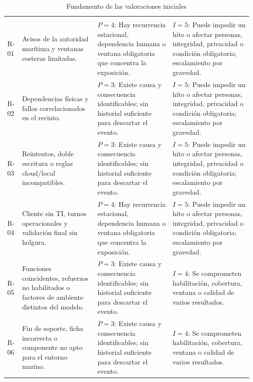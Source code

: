 \begin{longtable}{L{.10\textwidth}L{.27\textwidth}L{.27\textwidth}L{.27\textwidth}}
\caption{Fundamento de las valoraciones iniciales}\label{tab:sd8-fundamentos}\\\hline
{} &  &  & \\\hline\endfirsthead
\hline{} &  &  & \\\hline\endhead
R-01 & Avisos de la autoridad marítima y ventanas costeras limitadas. & $P=4$: Hay recurrencia estacional, dependencia humana o ventana obligatoria que concentra la exposición. & $I=5$: Puede impedir un hito o afectar personas, integridad, privacidad o condición obligatoria; escalamiento por gravedad.\\\hline
R-02 & Dependencias físicas y fallos correlacionados en el recinto. & $P=3$: Existe causa y consecuencia identificables; sin historial suficiente para descartar el evento. & $I=5$: Puede impedir un hito o afectar personas, integridad, privacidad o condición obligatoria; escalamiento por gravedad.\\\hline
R-03 & Reintentos, doble escritura o reglas cloud/local incompatibles. & $P=3$: Existe causa y consecuencia identificables; sin historial suficiente para descartar el evento. & $I=5$: Puede impedir un hito o afectar personas, integridad, privacidad o condición obligatoria; escalamiento por gravedad.\\\hline
R-04 & Cliente sin TI, turnos operacionales y validación final sin holgura. & $P=4$: Hay recurrencia estacional, dependencia humana o ventana obligatoria que concentra la exposición. & $I=5$: Puede impedir un hito o afectar personas, integridad, privacidad o condición obligatoria; escalamiento por gravedad.\\\hline
R-05 & Funciones coincidentes, refuerzos no habilitados o factores de ambiente distintos del modelo. & $P=3$: Existe causa y consecuencia identificables; sin historial suficiente para descartar el evento. & $I=4$: Se comprometen habilitación, cobertura, ventana o calidad de varios resultados.\\\hline
R-06 & Fin de soporte, ficha incorrecta o componente no apto para el entorno marino. & $P=3$: Existe causa y consecuencia identificables; sin historial suficiente para descartar el evento. & $I=4$: Se comprometen habilitación, cobertura, ventana o calidad de varios resultados.\\\hline

\end{longtable}

